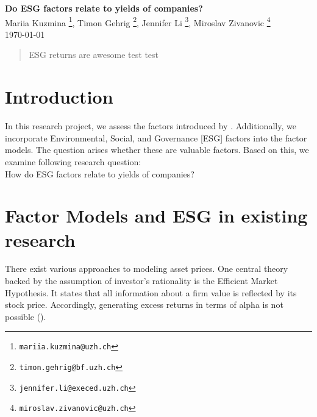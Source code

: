 \documentclass[12pt, a4paper]{article}%
\begin{document}
%
%

\begin{titlepage}

\setlength{\topmargin}{0.5cm}

\center

{\Large \bfseries Do ESG factors relate to yields of companies?
}\\[0.5cm] 

Mariia Kuzmina \footnote{\texttt{mariia.kuzmina@uzh.ch}},
Timon Gehrig \footnote{\texttt{timon.gehrig@bf.uzh.ch}},
Jennifer Li \footnote{\texttt{jennifer.li@execed.uzh.ch}},
Miroslav Zivanovic \footnote{\texttt{miroslav.zivanovic@uzh.ch}}\\
\today
\\ [2cm]

\begin{abstract}
ESG returns are awesome test test 
\end{abstract}

\vspace{3cm}



\vfill 
\end{titlepage}

\tableofcontents


%
%
\newpage
\section{Introduction}
In this research project, we assess the factors introduced by \textcite{FamaFrench1992}. Additionally, we incorporate Environmental, Social, and Governance [ESG] factors into the factor models.
The question arises whether these are valuable factors. Based on this, we examine following research question:\\


How do ESG factors relate to yields of companies?

%
%												   
\section{Factor Models and ESG in existing research}
There exist various approaches to modeling asset prices. One central theory backed by the assumption of investor's rationality is the Efficient Market Hypothesis. It states that all information about a firm value is reflected by its stock price. Accordingly, generating excess returns in terms of alpha is not possible (\textcite{Fama1970}). 
\end{document}
